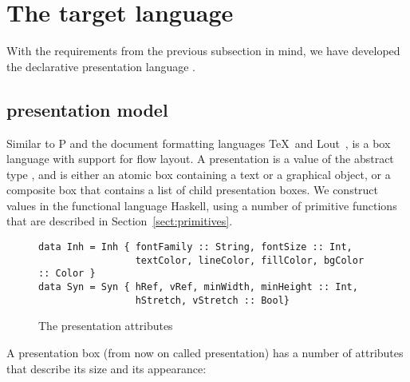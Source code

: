 \ec



%																
%																
%																
\section{The {\Xprez} target language} \label{sect:xpreztarget}

With the requirements from the previous subsection in mind, we have developed the declarative presentation language {\Xprez}. 

%																
\subsection{{\Xprez} presentation model}

Similar to P and the document formatting languages \TeX ~and Lout~\cite{kingston93lout}, {\Xprez} is a box language with support for flow layout. A presentation is a value of the abstract type , and is either an atomic box containing a text or a graphical object, or a composite box that contains a list of child presentation boxes.  We construct  values in the functional language Haskell, using a number of primitive functions that are described in Section~\ref{sect:primitives}.

\begin{figure}
\begin{small}
\begin{center}
\begin{small}
\begin{verbatim}
data Inh = Inh { fontFamily :: String, fontSize :: Int,
                 textColor, lineColor, fillColor, bgColor :: Color } 
data Syn = Syn { hRef, vRef, minWidth, minHeight :: Int,
                 hStretch, vStretch :: Bool}
\end{verbatim}
\end{small}
\caption{The {\Xprez} presentation attributes}\label{xprezattributes} 
\end{center}
\end{small}
\end{figure}


A presentation box (from now on called presentation) has a number of attributes that describe its size and its appearance: 

\begin{center}
\end{center}

